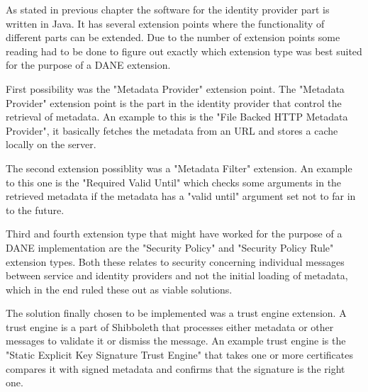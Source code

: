 
As stated in previous chapter the software for the identity provider part is written in Java.
It has several extension points where the functionality of different parts can be extended.
Due to the number of extension points some reading had to be done to figure out exactly which extension type was best suited for the purpose of a DANE extension.

First possibility was the "Metadata Provider" extension point.
The "Metadata Provider" extension point is the part in the identity provider that control the retrieval of metadata.
An example to this is the "File Backed HTTP Metadata Provider", it basically fetches the metadata from an URL and stores a cache locally on the server.

The second extension possiblity was a "Metadata Filter" extension.
An example to this one is the "Required Valid Until" which checks some arguments in the retrieved metadata if the metadata has a "valid until" argument set not to far in to the future.

Third and fourth extension type that might have worked for the purpose of a DANE implementation are the "Security Policy" and "Security Policy Rule" extension types.
Both these relates to security concerning individual messages between service and identity providers and not the initial loading of metadata, which in the end ruled these out as viable solutions.

The solution finally chosen to be implemented was a trust engine extension.
A trust engine is a part of Shibboleth that processes either metadata or other messages to validate it or dismiss the message.
An example trust engine is the "Static Explicit Key Signature Trust Engine" that takes one or more certificates compares it with signed metadata and confirms that the signature is the right one. 



